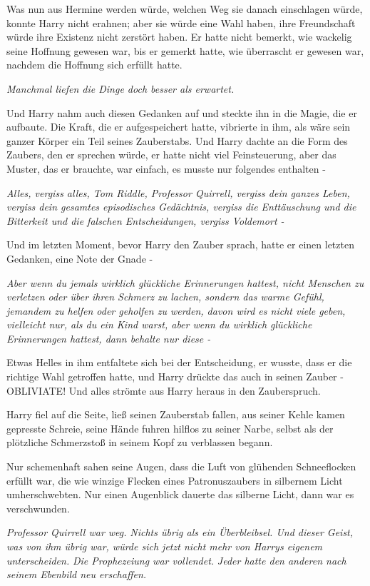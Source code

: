 Was nun aus Hermine werden würde, welchen Weg sie danach einschlagen würde,
konnte Harry nicht erahnen; aber sie würde eine Wahl haben, ihre Freundschaft
würde ihre Existenz nicht zerstört haben. Er hatte nicht bemerkt, wie wackelig
seine Hoffnung gewesen war, bis er gemerkt hatte, wie überrascht er gewesen war,
nachdem die Hoffnung sich erfüllt hatte.

\emph{Manchmal liefen die Dinge doch besser als erwartet.}

Und Harry nahm auch diesen Gedanken auf und steckte ihn in die Magie, die er
aufbaute. Die Kraft, die er aufgespeichert hatte, vibrierte in ihm, als wäre
sein ganzer Körper ein Teil seines Zauberstabs. Und Harry dachte an die Form des
Zaubers, den er sprechen würde, er hatte nicht viel Feinsteuerung, aber das
Muster, das er brauchte, war einfach, es musste nur folgendes enthalten -

\emph{Alles, vergiss alles, Tom Riddle, Professor Quirrell, vergiss dein ganzes
Leben, vergiss dein gesamtes episodisches Gedächtnis, vergiss die Enttäuschung
und die Bitterkeit und die falschen Entscheidungen, vergiss Voldemort -}

Und im letzten Moment, bevor Harry den Zauber sprach, hatte er einen letzten
Gedanken, eine Note der Gnade -

\emph{Aber wenn du jemals wirklich glückliche Erinnerungen hattest, nicht
Menschen zu verletzen oder über ihren Schmerz zu lachen, sondern das warme
Gefühl, jemandem zu helfen oder geholfen zu werden, davon wird es nicht viele
geben, vielleicht nur, als du ein Kind warst, aber wenn du wirklich glückliche
Erinnerungen hattest, dann behalte nur diese -}

Etwas Helles in ihm entfaltete sich bei der Entscheidung, er wusste, dass er die
richtige Wahl getroffen hatte, und Harry drückte das auch in seinen Zauber -
\glqq{}OBLIVIATE!\grqq{} Und alles strömte aus Harry heraus in den Zauberspruch.

Harry fiel auf die Seite, ließ seinen Zauberstab fallen, aus seiner Kehle kamen
gepresste Schreie, seine Hände fuhren hilflos zu seiner Narbe, selbst als der
plötzliche Schmerzstoß in seinem Kopf zu verblassen begann.

Nur schemenhaft sahen seine Augen, dass die Luft von glühenden Schneeflocken
erfüllt war, die wie winzige Flecken eines Patronuszaubers in silbernem Licht
umherschwebten. Nur einen Augenblick dauerte das silberne Licht, dann war es
verschwunden.

\emph{Professor Quirrell war weg.}
\emph{Nichts übrig als ein Überbleibsel. Und dieser Geist, was von ihm übrig
war, würde sich jetzt nicht mehr von Harrys eigenem unterscheiden.}   \emph{Die
Prophezeiung war vollendet. }   \emph{Jeder hatte den anderen nach seinem
Ebenbild neu erschaffen.}

